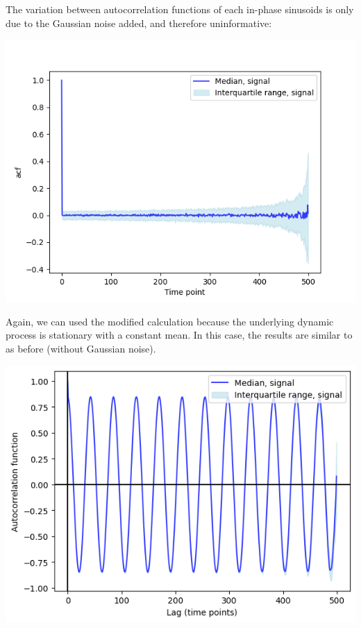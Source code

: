 \begin{enumerate}
\begin{enumerate}
The variation between autocorrelation functions of each in-phase sinusoids is only due to the Gaussian noise added, and therefore uninformative:
\begin{center}
\includegraphics[width=.9\linewidth]{noisysinusoids_inphase_acf.png}
\end{center}

Again, we can used the modified calculation because the underlying dynamic process is stationary with a constant mean.  In this case, the results are similar to as before (without Gaussian noise).
\begin{center}
\includegraphics[width=.9\linewidth]{noisysinusoids_inphase_acf_stationary.png}
\end{center}


\end{enumerate}
\end{enumerate}
